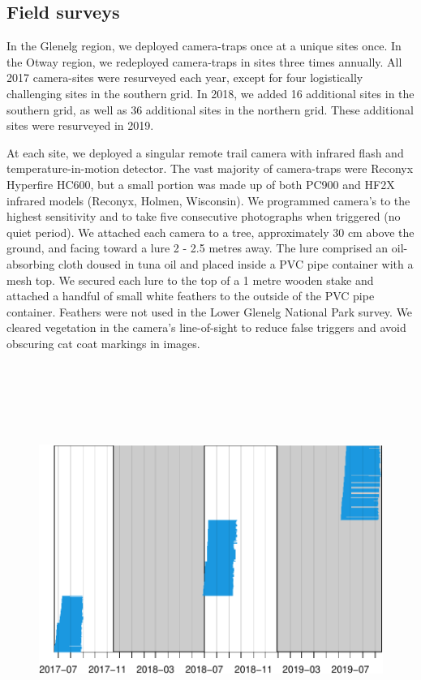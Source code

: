 \documentclass[11pt,a4paper,titlepage,twoside,openright]{style/unimelbthesis}
\begin{document}
\begin{mainmatter}
\newpage

\hypertarget{density-app-field}{%
\section{Field surveys}\label{density-app-field}}

In the Glenelg region, we deployed camera-traps once at a unique sites once. In the Otway region, we redeployed camera-traps in sites three times annually. All 2017 camera-sites were resurveyed each year, except for four logistically challenging sites in the southern grid. In 2018, we added 16 additional sites in the southern grid, as well as 36 additional sites in the northern grid. These additional sites were resurveyed in 2019.

At each site, we deployed a singular remote trail camera with infrared flash and temperature-in-motion detector. The vast majority of camera-traps were Reconyx Hyperfire HC600, but a small portion was made up of both PC900 and HF2X infrared models (Reconyx, Holmen, Wisconsin). We programmed camera's to the highest sensitivity and to take five consecutive photographs when triggered (no quiet period). We attached each camera to a tree, approximately 30 cm above the ground, and facing toward a lure 2 - 2.5 metres away. The lure comprised an oil-absorbing cloth doused in tuna oil and placed inside a PVC pipe container with a mesh top. We secured each lure to the top of a 1 metre wooden stake and attached a handful of small white feathers to the outside of the PVC pipe container. Feathers were not used in the Lower Glenelg National Park survey. We cleared vegetation in the camera's line-of-sight to reduce false triggers and avoid obscuring cat coat markings in images.

\newpage

\(~\)

\(~\)

\(~\)
\begin{figure}

{\centering \includegraphics[width=1\linewidth]{figure/density-camop-1} 

}
\end{figure}
\end{mainmatter}
\end{document}
